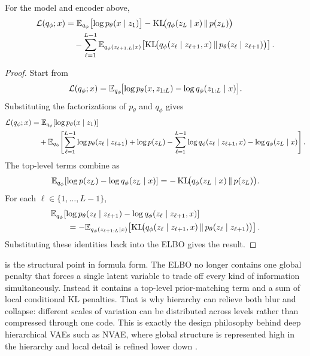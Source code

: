 \documentclass[11pt]{article}
\begin{document}
\begin{proposition}
\label{prop:hierarchical-elbo}
For the model and encoder above,
\begin{align*}
  \mathcal{L}(q_\phi;x)
  &=
  \mathbb{E}_{q_\phi}\bigl[\log p_\theta(x\mid z_1)\bigr]
  -
  \operatorname{KL}\!\bigl(q_\phi(z_L\mid x)\,\|\,p(z_L)\bigr) \\
  &\quad
  -
  \sum_{\ell=1}^{L-1}
  \mathbb{E}_{q_\phi(z_{\ell+1:L}\mid x)}\!\left[
    \operatorname{KL}\!\bigl(
      q_\phi(z_\ell\mid z_{\ell+1},x)\,\|\,p_\theta(z_\ell\mid z_{\ell+1})
    \bigr)
  \right].
\end{align*}
\end{proposition}
\begin{proof}
Start from
\[
  \mathcal{L}(q_\phi;x)
  =
  \mathbb{E}_{q_\phi}\!\bigl[\log p_\theta(x,z_{1:L})-\log q_\phi(z_{1:L}\mid x)\bigr].
\]
Substituting the factorizations of \(p_\theta\) and \(q_\phi\) gives
\begin{align*}
  \mathcal{L}(q_\phi;x)
  &=
  \mathbb{E}_{q_\phi}[\log p_\theta(x\mid z_1)] \\
  &\quad
  +
  \mathbb{E}_{q_\phi}\!\left[
    \sum_{\ell=1}^{L-1} \log p_\theta(z_\ell\mid z_{\ell+1})
    + \log p(z_L)
    - \sum_{\ell=1}^{L-1} \log q_\phi(z_\ell\mid z_{\ell+1},x)
    - \log q_\phi(z_L\mid x)
  \right].
\end{align*}
The top-level terms combine as
\[
  \mathbb{E}_{q_\phi}\!\left[\log p(z_L)-\log q_\phi(z_L\mid x)\right]
  =
  -\operatorname{KL}\!\bigl(q_\phi(z_L\mid x)\,\|\,p(z_L)\bigr).
\]
For each \(\ell\in\{1,\dots,L-1\}\),
\begin{align*}
  &\mathbb{E}_{q_\phi}\!\left[
    \log p_\theta(z_\ell\mid z_{\ell+1})
    -
    \log q_\phi(z_\ell\mid z_{\ell+1},x)
  \right] \\
  &\qquad
  =
  -\mathbb{E}_{q_\phi(z_{\ell+1:L}\mid x)}\!\left[
    \operatorname{KL}\!\bigl(
      q_\phi(z_\ell\mid z_{\ell+1},x)\,\|\,p_\theta(z_\ell\mid z_{\ell+1})
    \bigr)
  \right].
\end{align*}
Substituting these identities back into the ELBO gives the result.%
\end{proof}

 is the structural point in formula form.
The ELBO no longer contains one global penalty that forces a single latent variable to trade off every kind of information simultaneously.
Instead it contains a top-level prior-matching term and a sum of local conditional KL penalties.
That is why hierarchy can relieve both blur and collapse:
different scales of variation can be distributed across levels rather than compressed through one code.
This is exactly the design philosophy behind deep hierarchical VAEs such as NVAE, where global structure is represented high in the hierarchy and local detail is refined lower down
\citep[\S3.1]{vahdat_kautz_2020_nvae}.
\end{document}
